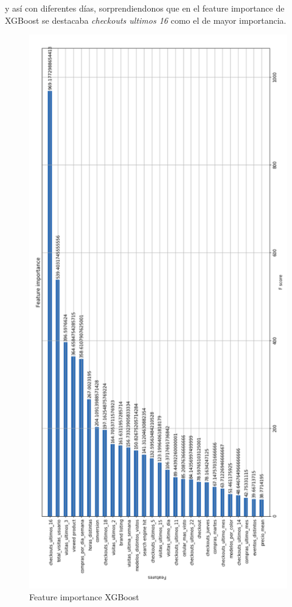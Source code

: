 \documentclass[a4paper ,12pt]{article}
\begin{document}
	y así con diferentes días, sorprendiendonos que en el feature importance de XGBoost se destacaba \textit{ checkouts ultimos 16} como el de mayor importancia.
	
	
	\begin{figure}
\centering
\includegraphics[width=\linewidth , height=0.9\textheight]{feature-XGB}
\caption{Feature importance XGBoost}
\label{fig:feature-XGB}
\end{figure}
\end{document}
